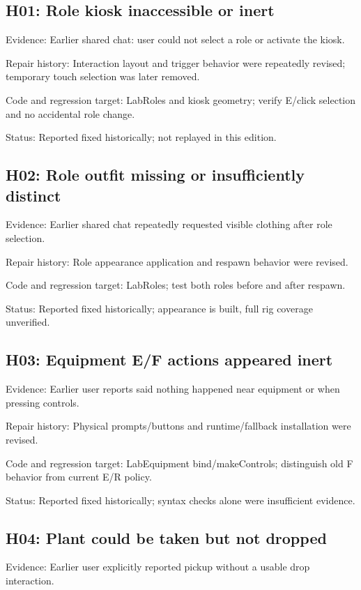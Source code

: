\subsection{H01: Role kiosk inaccessible or inert}
Evidence: Earlier shared chat: user could not select a role or activate the kiosk.\allowbreak{}

Repair history: Interaction layout and trigger behavior were repeatedly revised; temporary touch selection was later removed.\allowbreak{}

Code and regression target: LabRoles and kiosk geometry; verify E/\allowbreak{}click selection and no accidental role change.\allowbreak{}

Status: Reported fixed historically; not replayed in this edition.\allowbreak{}

\subsection{H02: Role outfit missing or insufficiently distinct}
Evidence: Earlier shared chat repeatedly requested visible clothing after role selection.\allowbreak{}

Repair history: Role appearance application and respawn behavior were revised.\allowbreak{}

Code and regression target: LabRoles; test both roles before and after respawn.\allowbreak{}

Status: Reported fixed historically; appearance is built, full rig coverage unverified.\allowbreak{}

\subsection{H03: Equipment E/\allowbreak{}F actions appeared inert}
Evidence: Earlier user reports said nothing happened near equipment or when pressing controls.\allowbreak{}

Repair history: Physical prompts/\allowbreak{}buttons and runtime/\allowbreak{}fallback installation were revised.\allowbreak{}

Code and regression target: LabEquipment bind/\allowbreak{}makeControls; distinguish old F behavior from current E/\allowbreak{}R policy.\allowbreak{}

Status: Reported fixed historically; syntax checks alone were insufficient evidence.\allowbreak{}

\subsection{H04: Plant could be taken but not dropped}
Evidence: Earlier user explicitly reported pickup without a usable drop interaction.\allowbreak{}

